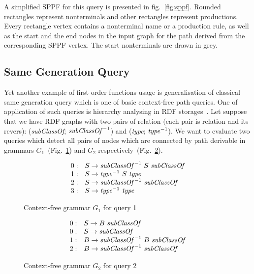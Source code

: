 A simplified SPPF for this query is presented in fig.~\ref{fig:sppf}. Rounded rectangles represent nonterminals and other rectangles represent productions.
Every rectangle vertex contains a nonterminal name or a production rule, as well as the start and the end nodes in the input graph for the path derived from the corresponding SPPF vertex.
The start nonterminals are drawn in grey.

\subsection{Same Generation Query}

Yet another example of first order functions usage is generalisation of classical same generation query which is one of basic context-free path queries.
One of application of such queries is hierarchy analysing in RDF storages~\cite{CFGonRDF}.
Let suppose that we have RDF graphs with two pairs of relation (each pair is relation and its revers): (\emph{subClassOf}; $\text{\emph{subClassOf}}^{-1}$) and (\emph{type}; $\text{\emph{type}}^{-1}$).
We want to evaluate two queries which detect all pairs of nodes which are connected by path derivable in grammars $G_1$~(Fig.~\ref{grammarQ1}) and $G_2$ respectively~(Fig.~\ref{grammarQ2}).


\begin{figure}[h]
   \centering
   \[
\begin{array}{rl}
   0: & S \rightarrow \text{\textit{subClassOf}}^{-1} \ S \ \text{\textit{subClassOf}} \\
   1: & S \rightarrow \text{\textit{type}}^{-1} \ S \ \text{\textit{type}} \\
   2: & S \rightarrow \text{\textit{subClassOf}}^{-1} \ \text{\textit{subClassOf}} \\
   3: & S \rightarrow \text{\textit{type}}^{-1} \ \text{\textit{type}} \\
\end{array}
\]
   \caption{Context-free grammar $G_1$ for query 1}
   \label{grammarQ1}
   \end{figure}

\begin{figure}[h]
   \centering
   \[
\begin{array}{rl}
   0: & S \rightarrow B \ \text{\textit{subClassOf}} \\
   0: & S \rightarrow \text{\textit{subClassOf}} \\
   1: & B \rightarrow \text{\textit{subClassOf}}^{-1} \ B \ \text{\textit{subClassOf}} \\
   2: & B \rightarrow \text{\textit{subClassOf}}^{-1} \ \text{\textit{subClassOf}} \\
\end{array}
\]
   \caption{Context-free grammar $G_2$ for query 2}
   \label{grammarQ2}
   \end{figure}

